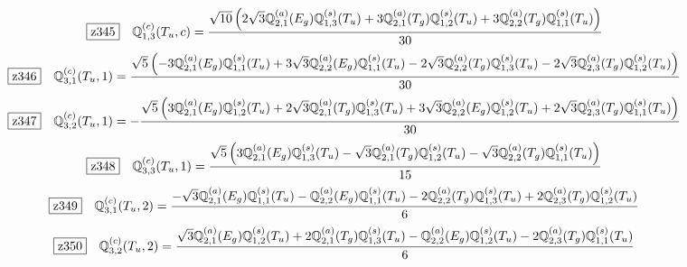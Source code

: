 \documentclass[fleqn,10pt,landscape]{jsarticle}
\begin{document}
\begin{dmath*}
\hspace*{3mm}\fbox{z345}\quad \mathbb{Q}_{1,3}^{(c)}(T_{u},c)=\frac{\sqrt{10} \left(2 \sqrt{3} \mathbb{Q}_{2,1}^{(a)}(E_{g}) \mathbb{Q}_{1,3}^{(s)}(T_{u}) + 3 \mathbb{Q}_{2,1}^{(a)}(T_{g}) \mathbb{Q}_{1,2}^{(s)}(T_{u}) + 3 \mathbb{Q}_{2,2}^{(a)}(T_{g}) \mathbb{Q}_{1,1}^{(s)}(T_{u})\right)}{30}
\end{dmath*}
\begin{dmath*}
\hspace*{3mm}\fbox{z346}\quad \mathbb{Q}_{3,1}^{(c)}(T_{u},1)=\frac{\sqrt{5} \left(- 3 \mathbb{Q}_{2,1}^{(a)}(E_{g}) \mathbb{Q}_{1,1}^{(s)}(T_{u}) + 3 \sqrt{3} \mathbb{Q}_{2,2}^{(a)}(E_{g}) \mathbb{Q}_{1,1}^{(s)}(T_{u}) - 2 \sqrt{3} \mathbb{Q}_{2,2}^{(a)}(T_{g}) \mathbb{Q}_{1,3}^{(s)}(T_{u}) - 2 \sqrt{3} \mathbb{Q}_{2,3}^{(a)}(T_{g}) \mathbb{Q}_{1,2}^{(s)}(T_{u})\right)}{30}
\end{dmath*}
\begin{dmath*}
\hspace*{3mm}\fbox{z347}\quad \mathbb{Q}_{3,2}^{(c)}(T_{u},1)=- \frac{\sqrt{5} \left(3 \mathbb{Q}_{2,1}^{(a)}(E_{g}) \mathbb{Q}_{1,2}^{(s)}(T_{u}) + 2 \sqrt{3} \mathbb{Q}_{2,1}^{(a)}(T_{g}) \mathbb{Q}_{1,3}^{(s)}(T_{u}) + 3 \sqrt{3} \mathbb{Q}_{2,2}^{(a)}(E_{g}) \mathbb{Q}_{1,2}^{(s)}(T_{u}) + 2 \sqrt{3} \mathbb{Q}_{2,3}^{(a)}(T_{g}) \mathbb{Q}_{1,1}^{(s)}(T_{u})\right)}{30}
\end{dmath*}
\begin{dmath*}
\hspace*{3mm}\fbox{z348}\quad \mathbb{Q}_{3,3}^{(c)}(T_{u},1)=\frac{\sqrt{5} \left(3 \mathbb{Q}_{2,1}^{(a)}(E_{g}) \mathbb{Q}_{1,3}^{(s)}(T_{u}) - \sqrt{3} \mathbb{Q}_{2,1}^{(a)}(T_{g}) \mathbb{Q}_{1,2}^{(s)}(T_{u}) - \sqrt{3} \mathbb{Q}_{2,2}^{(a)}(T_{g}) \mathbb{Q}_{1,1}^{(s)}(T_{u})\right)}{15}
\end{dmath*}
\begin{dmath*}
\hspace*{3mm}\fbox{z349}\quad \mathbb{Q}_{3,1}^{(c)}(T_{u},2)=\frac{- \sqrt{3} \mathbb{Q}_{2,1}^{(a)}(E_{g}) \mathbb{Q}_{1,1}^{(s)}(T_{u}) - \mathbb{Q}_{2,2}^{(a)}(E_{g}) \mathbb{Q}_{1,1}^{(s)}(T_{u}) - 2 \mathbb{Q}_{2,2}^{(a)}(T_{g}) \mathbb{Q}_{1,3}^{(s)}(T_{u}) + 2 \mathbb{Q}_{2,3}^{(a)}(T_{g}) \mathbb{Q}_{1,2}^{(s)}(T_{u})}{6}
\end{dmath*}
\begin{dmath*}
\hspace*{3mm}\fbox{z350}\quad \mathbb{Q}_{3,2}^{(c)}(T_{u},2)=\frac{\sqrt{3} \mathbb{Q}_{2,1}^{(a)}(E_{g}) \mathbb{Q}_{1,2}^{(s)}(T_{u}) + 2 \mathbb{Q}_{2,1}^{(a)}(T_{g}) \mathbb{Q}_{1,3}^{(s)}(T_{u}) - \mathbb{Q}_{2,2}^{(a)}(E_{g}) \mathbb{Q}_{1,2}^{(s)}(T_{u}) - 2 \mathbb{Q}_{2,3}^{(a)}(T_{g}) \mathbb{Q}_{1,1}^{(s)}(T_{u})}{6}
\end{dmath*}
\end{document}
